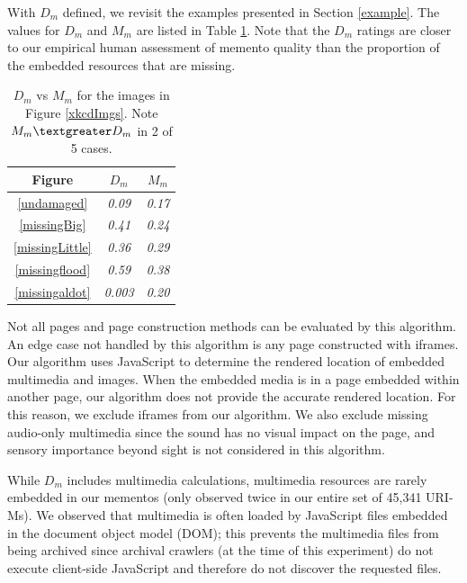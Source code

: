 With $D_m$ defined, we revisit the examples presented in Section \ref{example}. The values for $D_m$ and $M_m$ are listed in Table \ref{damageTable}. Note that the $D_m$ ratings are closer to our empirical human assessment of memento quality than the proportion of the embedded resources that are missing.

\begin{table}
\centering
\begin{tabular}{ c | c | c }
    \hline
    Figure & $D_m$ & $M_m$\\
    \hline
    \hline
\ref{undamaged} & \emph{0.09} & \emph{0.17}\\
\ref{missingBig} & \emph{0.41} & \emph{0.24}\\
\ref{missingLittle} & \emph{0.36} & \emph{0.29}\\
\ref{missingflood} & \emph{0.59} & \emph{0.38}\\
\ref{missingaldot} & \emph{0.003} & \emph{0.20}\\
    \hline
\end{tabular}
  \caption{$D_m$ vs $M_m$ for the images in Figure \ref{xkcdImgs}. Note $M_m \textgreater D_m$ in 2 of 5 cases.}
  \label{damageTable}
\end{table}

Not all pages and page construction methods can be evaluated by this algorithm. An edge case not handled by this algorithm is any page constructed with iframes. Our algorithm uses JavaScript to determine the rendered location of embedded multimedia and images. When the embedded media is in a page embedded within another page, our algorithm does not provide the accurate rendered location. For this reason, we exclude iframes from our algorithm. We also exclude missing audio-only multimedia since the sound has no visual impact on the page, and sensory importance beyond sight is not considered in this algorithm.

While $D_m$ includes multimedia calculations, multimedia resources are rarely embedded in our mementos (only observed twice in our entire set of 45,341 URI-Ms). We observed that multimedia is often loaded by JavaScript files embedded in the document object model (DOM); this prevents the multimedia files from being archived since archival crawlers (at the time of this experiment) do not execute client-side JavaScript and therefore do not discover the requested files.%
\\
\\
